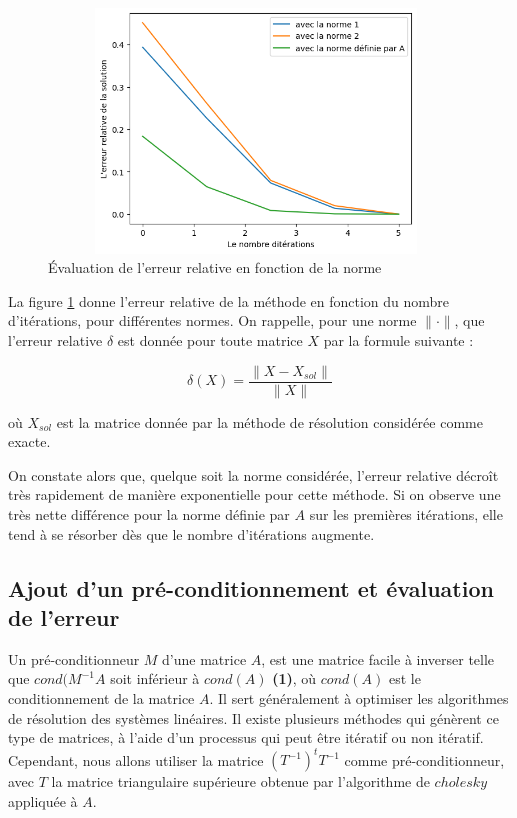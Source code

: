 \documentclass[a4paper]{article}
\begin{document}
\begin{figure}[!h] 
  \includegraphics[width=11cm, height= 6.5cm]{normes.png}
  \centering
  \caption{Évaluation de l'erreur relative en fonction de la norme}
  \label{fig:norme}
\end{figure}

La figure \ref{fig:norme} donne l'erreur relative de la méthode en fonction du nombre d'itérations, pour différentes normes. On rappelle, pour une norme $\| \cdot \|$, que l'erreur relative $\delta$ est donnée pour toute matrice $X$ par la formule suivante : 

\begin{equation*}
    \delta(X) = \frac{\|X - X_{sol}\|}{\| X \|}
\end{equation*}

où $X_{sol}$ est la matrice donnée par la méthode de résolution considérée comme exacte.

On constate alors que, quelque soit la norme considérée, l'erreur relative décroît très rapidement de manière exponentielle pour cette méthode. Si on observe une très nette différence pour la norme définie par $A$ sur les premières itérations, elle tend à se résorber dès que le nombre d'itérations augmente.

\subsection{Ajout d'un pré-conditionnement et évaluation de l'erreur}
Un pré-conditionneur $M$ d'une matrice $A$, est une matrice facile à inverser telle que $cond(M^{-1}A$ soit inférieur à $cond(A)$ \textbf{(1)}, où $cond(A)$ est le conditionnement de la matrice $A$. Il sert généralement à optimiser les algorithmes de résolution des systèmes linéaires. Il existe plusieurs méthodes qui génèrent ce type de matrices, à l'aide d'un processus qui peut être itératif ou non itératif. Cependant, nous allons utiliser la matrice $(T^{-1})^{t}T^{-1}$ comme pré-conditionneur, avec $T$ la matrice triangulaire supérieure obtenue par l'algorithme de $cholesky$ appliquée à $A$. 
\end{document}

